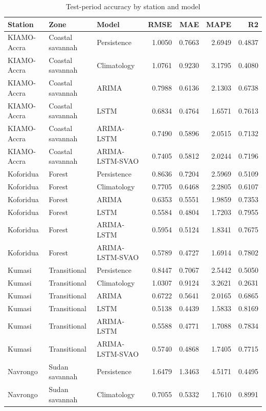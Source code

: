 \begin{table}[H]
\centering
\caption{Test-period accuracy by station and model}
\label{tab:per-station}
\begin{singlespace}
\begin{tabular}{lllrrrr}
\toprule
Station & Zone & Model & RMSE & MAE & MAPE & R2 \\
\midrule
KIAMO-Accra & Coastal savannah & Persistence & 1.0050 & 0.7663 & 2.6949 & 0.4837 \\
KIAMO-Accra & Coastal savannah & Climatology & 1.0761 & 0.9230 & 3.1795 & 0.4080 \\
KIAMO-Accra & Coastal savannah & ARIMA & 0.7988 & 0.6136 & 2.1303 & 0.6738 \\
KIAMO-Accra & Coastal savannah & LSTM & 0.6834 & 0.4764 & 1.6571 & 0.7613 \\
KIAMO-Accra & Coastal savannah & ARIMA-LSTM & 0.7490 & 0.5896 & 2.0515 & 0.7132 \\
KIAMO-Accra & Coastal savannah & ARIMA-LSTM-SVAO & 0.7405 & 0.5812 & 2.0244 & 0.7196 \\
Koforidua & Forest & Persistence & 0.8636 & 0.7204 & 2.5969 & 0.5109 \\
Koforidua & Forest & Climatology & 0.7705 & 0.6468 & 2.2805 & 0.6107 \\
Koforidua & Forest & ARIMA & 0.6353 & 0.5551 & 1.9859 & 0.7353 \\
Koforidua & Forest & LSTM & 0.5584 & 0.4804 & 1.7203 & 0.7955 \\
Koforidua & Forest & ARIMA-LSTM & 0.5954 & 0.5124 & 1.8341 & 0.7675 \\
Koforidua & Forest & ARIMA-LSTM-SVAO & 0.5789 & 0.4727 & 1.6914 & 0.7802 \\
Kumasi & Transitional & Persistence & 0.8447 & 0.7067 & 2.5442 & 0.5050 \\
Kumasi & Transitional & Climatology & 1.0307 & 0.9124 & 3.2621 & 0.2631 \\
Kumasi & Transitional & ARIMA & 0.6722 & 0.5641 & 2.0165 & 0.6865 \\
Kumasi & Transitional & LSTM & 0.5138 & 0.4439 & 1.5833 & 0.8169 \\
Kumasi & Transitional & ARIMA-LSTM & 0.5588 & 0.4771 & 1.7088 & 0.7834 \\
Kumasi & Transitional & ARIMA-LSTM-SVAO & 0.5740 & 0.4868 & 1.7405 & 0.7715 \\
Navrongo & Sudan savannah & Persistence & 1.6479 & 1.3463 & 4.5171 & 0.4495 \\
Navrongo & Sudan savannah & Climatology & 0.7055 & 0.5332 & 1.7610 & 0.8991 \\

\end{tabular}
\end{singlespace}
\end{table}
